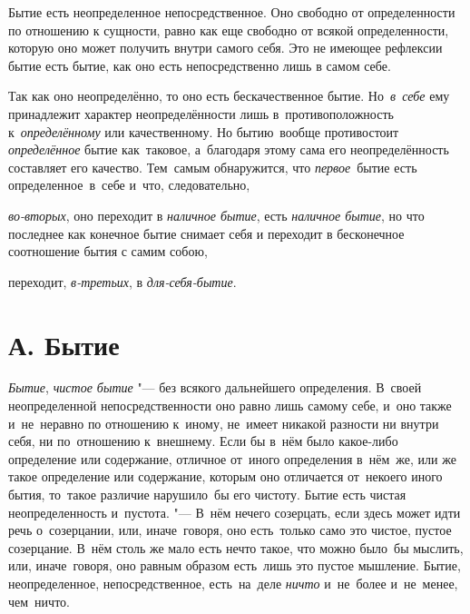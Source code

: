 Бытие есть неопределенное непосредственное. Оно свободно от определенности
по отношению к сущности, равно как еще свободно от всякой определенности,
которую оно может получить внутри самого себя. Это не имеющее рефлексии
бытие есть бытие, как оно есть непосредственно лишь в самом себе.

Так как оно неопределённо, то оно есть бескачественное бытие.
Но~{\em в~себе} ему принадлежит характер неопределённости
лишь в~противоположность к~{\em определённому} или
качественному. Но бытию~вообще противостоит
{\em определённое} бытие как~таковое, а~благодаря этому
сама его неопределённость составляет его качество. Тем~самым
обнаружится, что {\em первое}~бытие есть определенное~в~себе
и~что, следовательно,

{\em во-вторых}, оно переходит в
{\em наличное бытие}, есть
{\em наличное бытие}, но что последнее как конечное
бытие снимает себя и переходит в бесконечное
соотношение бытия с самим собою,

переходит, {\em в-третьих}, в {\em для-себя-бытие}.

\section[А. Бытие]{А. Бытие}

{\em Бытие}, {\em чистое бытие} "--- без всякого дальнейшего определения.
В~своей неопределенной непосредственности оно равно лишь
самому себе, и~оно также и~не~неравно по отношению к~иному, не~имеет
никакой разности ни внутри себя, ни по~отношению к~внешнему. Если бы
в~нём было какое-либо определение или
содержание, отличное от~иного определения в~нём~же, или же такое
определение или содержание, которым оно отличается от~некоего иного
бытия, то~такое различие нарушило~бы его чистоту. Бытие есть чистая
неопределенность и~пустота. "--- В~нём нечего созерцать, если здесь
может идти речь о~созерцании, или, иначе~говоря, оно есть~только само
это чистое, пустое созерцание.
В~нём столь же мало есть нечто такое, что можно было~бы
мыслить, или, иначе~говоря, оно равным образом есть~лишь это пустое
мышление. Бытие, неопределенное, непосредственное, есть~на~деле
{\em ничто} и~не~более и~не~менее, чем~ничто.


